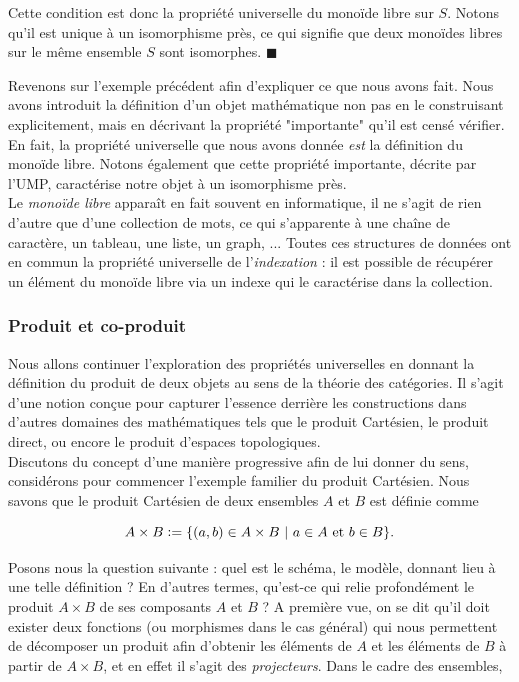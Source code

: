 \documentclass{article}
\begin{document}
\begin{example}{}
    \noindent
    Cette condition est donc la propriété universelle du monoïde libre sur $S$. Notons qu'il est unique à un isomorphisme près, ce qui signifie que deux monoïdes libres sur le même ensemble $S$ sont isomorphes. $\blacksquare$
\end{example}

Revenons sur l'exemple précédent afin d'expliquer ce que nous avons fait. Nous avons introduit la définition d'un objet mathématique non pas en le construisant explicitement, mais en décrivant la propriété "importante" qu'il est censé vérifier. En fait, la propriété universelle que nous avons donnée \textit{est} la définition du monoïde libre. Notons également que cette propriété importante, décrite par l'UMP, caractérise notre objet à un isomorphisme près.\\

Le \textit{monoïde libre} apparaît en fait souvent en informatique, il ne s'agit de rien d'autre que d'une collection de mots, ce qui s'apparente à une chaîne de caractère, un tableau, une liste, un graph, ... Toutes ces structures de données ont en commun la propriété universelle de l'\textit{indexation} : il est possible de récupérer un élément du monoïde libre via un indexe qui le caractérise dans la collection.

\subsubsection{Produit et co-produit}
Nous allons continuer l'exploration des propriétés universelles en donnant la définition du produit de deux objets au sens de la théorie des catégories. Il s'agit d'une notion conçue pour capturer l'essence derrière les constructions dans d'autres domaines des mathématiques tels que le produit Cartésien, le produit direct, ou encore le produit d'espaces topologiques.\\

Discutons du concept d'une manière progressive afin de lui donner du sens, considérons pour commencer l'exemple familier du produit Cartésien. Nous savons que le produit Cartésien de deux ensembles $A$ et $B$ est définie comme

$$
A\times B\defeq\{(a, b)\in A\times B\ |\ a\in A\text{ et }b\in B\}.
$$

\noindent
Posons nous la question suivante : quel est le schéma, le modèle, donnant lieu à une telle définition ? En d'autres termes, qu'est-ce qui relie profondément le produit $A\times B$ de ses composants $A$ et $B$ ? A première vue, on se dit qu'il doit exister deux fonctions (ou morphismes dans le cas général) qui nous permettent de décomposer un produit afin d'obtenir les éléments de $A$ et les éléments de $B$ à partir de $A\times B$, et en effet il s'agit des \textit{projecteurs}. Dans le cadre des ensembles,
\end{document}
